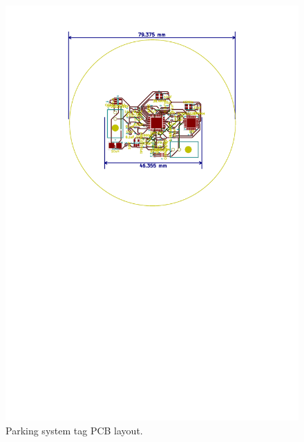 \begin{figure}[H]
\begin{center}
\includegraphics[scale=0.7,trim={4cm 15cm 4cm 1cm},clip]{data/pcb-layout.pdf}
\caption{Parking system tag PCB layout.}
\end{center}
\end{figure}

